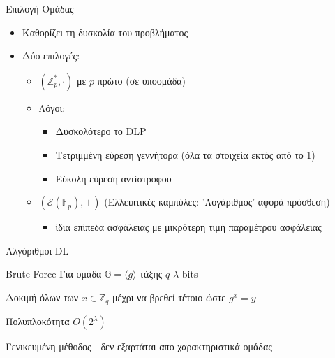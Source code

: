\documentclass[handout]{beamer}
\begin{document}
\begin{frame}{Επιλογή Ομάδας}
	\begin{itemize}
		\item Καθορίζει τη δυσκολία του προβλήματος 
		\item Δύο επιλογές:
		\begin{itemize}
			\item $(\mathbb{Z}_p^*, \cdot)$ με $p$ πρώτο (σε υποομάδα)
			\item Λόγοι:
			\begin{itemize}
				\item Δυσκολότερο το DLP
				\item Τετριμμένη εύρεση γεννήτορα (όλα τα στοιχεία εκτός από το 1)
				\item Εύκολη εύρεση αντίστροφου
			\end{itemize}
			\item $(\mathcal{E}(\mathbb{F}_p),+)$ (Ελλειπτικές καμπύλες: 'Λογάριθμος' αφορά πρόσθεση)
			\begin{itemize}
				\item ίδια επίπεδα ασφάλειας με μικρότερη τιμή παραμέτρου ασφάλειας
			\end{itemize}
		\end{itemize}  
	\end{itemize}
	\end{frame}

\begin{frame}{Αλγόριθμοι DL}
\begin{block}{Brute Force}
Για ομάδα $\mathbb{G}=\langle g \rangle$ τάξης $q$ $\lambda$ bits
\medskip

Δοκιμή όλων των $x \in \mathbb{Z}_q$ μέχρι να βρεθεί τέτοιο ώστε $g^x = y$
\medskip

Πολυπλοκότητα $O(2^\lambda)$

Γενικευμένη μέθοδος - δεν εξαρτάται απο χαρακτηριστικά ομάδας
\end{block}
\end{frame}

%
%
%
%
\end{document}
